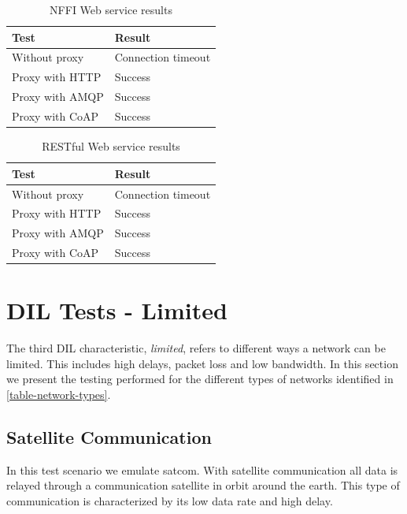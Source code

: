 \begin{table}[h!]
\begin{tabular}{| l | l |}
\hline
  \textbf{Test} & \textbf{Result} \\ \hline
  Without proxy & Connection timeout \\ \hline
  Proxy with HTTP & Success \\ \hline
  Proxy with AMQP & Success \\ \hline
  Proxy with CoAP & Success \\ \hline
\end{tabular}
\caption{NFFI Web service results}
\label{table:disconnected-nffi}
\end{table}

\begin{table}[h!]
\begin{tabular}{| l | l |}
\hline
  \textbf{Test} & \textbf{Result} \\ \hline
  Without proxy & Connection timeout \\ \hline
  Proxy with HTTP & Success \\ \hline
  Proxy with AMQP & Success \\ \hline
  Proxy with CoAP & Success \\ \hline
\end{tabular}
\caption{RESTful Web service results}
\label{table:disconnected-rest}
\end{table}


\section{DIL Tests - Limited}

The third DIL characteristic, \textit{limited}, refers to different ways a
network can be limited. This includes high delays, packet loss and low
bandwidth. In this section we present the testing performed for the different
types of networks identified in \cref{table-network-types}.



\subsection{Satellite Communication}

In this test scenario we emulate \gls{satcom}. With satellite communication
all data is relayed through a communication satellite in orbit around
the earth. This type of communication is characterized by its low data rate
and high delay.

